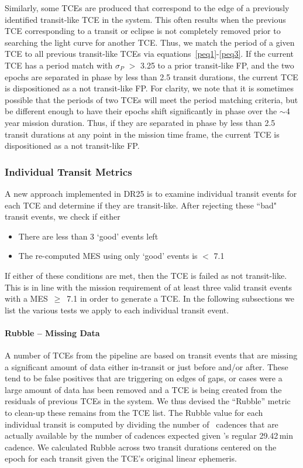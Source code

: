 Similarly, some TCEs are produced that correspond to the edge of a previously identified transit-like TCE in the system. This often results when the previous TCE corresponding to a transit or eclipse is not completely removed prior to searching the light curve for another TCE. Thus, we match the period of a given TCE to all previous transit-like TCEs via equations~\ref{peq1}-\ref{peq3}.  If the current TCE has a period match with $\sigma_{P}$ $>$ 3.25 to a prior transit-like FP, and the two epochs are separated in phase by less than 2.5 transit durations, the current TCE is dispositioned as a not transit-like FP. For clarity, we note that it is sometimes possible that the periods of two TCEs will meet the period matching criteria, but be different enough to have their epochs shift significantly in phase over the $\sim$4 year mission duration. Thus, if they are separated in phase by less than 2.5 transit durations at any point in the mission time frame, the current TCE is dispositioned as a not transit-like FP.



\subsubsection{Individual Transit Metrics}
\label{s:indivtrans}
A new approach implemented in DR25 is to examine individual transit events for each TCE and determine if they are transit-like. After rejecting these ``bad" transit events, we check if either

\begin{itemize}
\item There are less than 3 `good' events left
\item The re-computed MES using only `good' events is $<$ 7.1
\end{itemize}

\noindent If either of these conditions are met, then the TCE is failed as not transit-like. This is in line with the \kepler{} mission requirement of at least three valid transit events with a MES~$\ge$~7.1 in order to generate a TCE. In the following subsections we list the various tests we apply to each individual transit event.


\paragraph{Rubble -- Missing Data}
\label{s:rubble}
A number of TCEs from the \kepler{} pipeline are based on transit events that are missing a significant amount of data either in-transit or just before and/or after. These tend to be false positives that are triggering on edges of gaps, or cases were a large amount of data has been removed and a TCE is being created from the residuals of previous TCEs in the system. We thus devised the ``Rubble'' metric to clean-up these remains from the TCE list. The Rubble value for each individual transit is computed by dividing the number of \Kepler\ cadences that are actually available by the number of cadences expected given \Kepler's regular 29.42\,min cadence.  We calculated Rubble across two transit durations centered on the epoch for each transit given the TCE's original linear ephemeris. 


